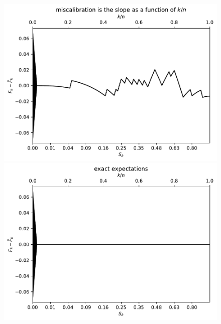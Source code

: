 \documentclass{article}
\begin{document}
\begin{figure}
\begin{centering}

\parbox{\imsize}{\includegraphics[width=\imsize]
                {./codes/unweighted/100_4_1_3/cumulative.pdf}}
\quad\quad
\parbox{\imsize}{\includegraphics[width=\imsize]
                {./codes/unweighted/100_4_1_3/cumulative_exact.pdf}}

\vspace{\vertsep}


\end{centering}
\end{figure}
\end{document}
